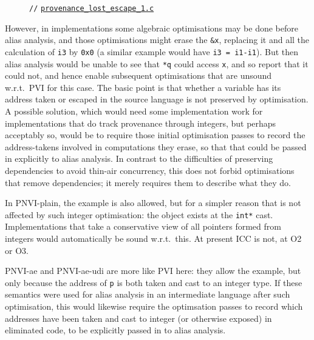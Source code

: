 \documentclass[acmsmall,review,screen]{acmart}\settopmatter{printfolios=true,printccs=false,printacmref=false}
\newcommand{\mytesturl}[1]{https://cerberus.cl.cam.ac.uk/cerberus?defacto/#1}
\newcommand{\mytestlink}[2]{\href{\mytesturl{#1}}{#2}}
\newcommand{\mylsttestlink}[1]{\mytestlink{#1}{\lstinline{#1}}}
\newcommand{\mylistingmargin}{5mm}
\newcommand{\myqtlinkexample}[4]{{\vspace*{-0.5\baselineskip}\par{\noindent\small\hspace*{\mylistingmargin}\lstinline{//} #4\vspace*{-0.25\baselineskip}}}}
\newcommand{\myqtexample}[3]{\myqtlinkexample{#1}{#2}{#3}{{\mylsttestlink{#2}}}}
\newcommand{\mycerbexamplename}[2]{\mytestlink{#2}{\lstinline{#1}}}
\newcommand{\mycerbexample}[4]{{\vspace*{-0.5\baselineskip}\par{\noindent\small\hspace*{\mylistingmargin}\lstinline{//} \mycerbexamplename{#2}{#4}\vspace*{0.25\baselineskip}\par}}}
\begin{document}
%
\begin{figure}
{\renewcommand{\mylistingmargin}{0mm}\vspace*{-0.0\baselineskip}
\mycerbexample{charon_tests/}{provenance_lost_escape_1.c}{http://www.cl.cam.ac.uk/users/pes20/cerberus/tests/provenance_lost_escape_1.c.html}{provenance_lost_escape_1.c}
\vspace*{-1.5\baselineskip}
}
\end{figure}
However, in implementations some algebraic optimisations may be done before alias
analysis, %
and those optimisations might erase the  \lstinline{&x}, replacing it and
all the calculation of \lstinline{i3} by \lstinline{0x0} (a similar example would have \lstinline{i3 = i1-i1}).  
But then alias analysis would be unable to see that \lstinline{*q} could access
\lstinline{x}, and so report that it could not, and hence enable
subsequent optimisations
that are unsound w.r.t.~PVI for this case.  The basic point is that whether a
variable has its address taken or escaped in the source language is
not preserved by optimisation.
%
A possible solution, which would need some implementation work for
implementations that do track provenance through integers, but
perhaps acceptably so, would be to require those initial optimisation
passes to record the address-takens involved in computations they erase, so
that that could be passed in explicitly to alias analysis.
%
In contrast to the difficulties of preserving dependencies to avoid
thin-air concurrency, this does not forbid optimisations that remove
dependencies; it merely requires them to describe what they do.

In PNVI-plain, the example is also allowed, but for a simpler reason that is
not affected by such integer optimisation: the object exists at
the \lstinline{int*} cast.  Implementations that  take a conservative view of all pointers
formed from integers  would automatically be sound w.r.t.~this. At
present ICC is not, at O2 or O3.


PNVI-ae and PNVI-ae-udi are more like PVI here: they allow the
example, but only because the address of \lstinline{p} is both taken
and cast to an integer type.   If these semantics were used for
alias analysis in an intermediate language after such optimisation,
this would likewise require the optimsation passes to record which
addresses have been taken and cast to integer (or otherwise exposed)
in eliminated code, to be explicitly passed
in to alias analysis. 
\end{document}
